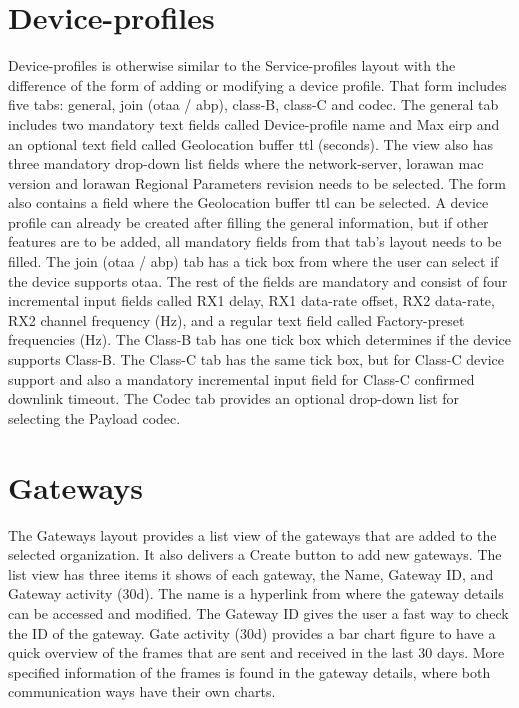 \section{Device-profiles}
Device-profiles is otherwise similar to the Service-profiles layout with the difference of the form of adding or modifying a device profile.
That form includes five tabs: general, join (\gls{otaa} / \gls{abp}), class-B, class-C and codec.
The general tab includes two mandatory text fields called Device-profile name and Max \gls{eirp} and an optional text field called Geolocation buffer \gls{ttl} (seconds). The view also has three mandatory drop-down list fields where the network-server, \gls{lorawan} \gls{mac} version and \gls{lorawan} Regional Parameters revision needs to be selected.
The form also contains a field where the Geolocation buffer \gls{ttl} can be selected.
A device profile can already be created after filling the general information, but if other features are to be added, all mandatory fields from that tab's layout needs to be filled.
The join (\gls{otaa} / \gls{abp}) tab has a tick box from where the user can select if the device supports \gls{otaa}.
The rest of the fields are mandatory and consist of four incremental input fields called RX1 delay, RX1 data-rate offset, RX2 data-rate, RX2 channel frequency (Hz), and a regular text field called Factory-preset frequencies (Hz).
The Class-B tab has one tick box which determines if the device supports Class-B.
The Class-C tab  has the same tick box, but for Class-C device support and also a mandatory incremental input field for Class-C confirmed downlink timeout.
The Codec tab provides an optional drop-down list for selecting the Payload codec.

\section{Gateways}
The Gateways layout provides a list view of the gateways that are added to the selected organization. 
It also delivers a Create button to add new gateways.
The list view has three items it shows of each gateway, the Name, Gateway ID, and Gateway activity (30d).
The name is a hyperlink from where the gateway details can be accessed and modified.
The Gateway ID gives the user a fast way to check the ID of the gateway. 
Gate activity (30d) provides a bar chart figure to have a quick overview of the frames that are sent and received in the last 30 days.
More specified information of the frames is found in the gateway details, where both communication ways have their own charts.

